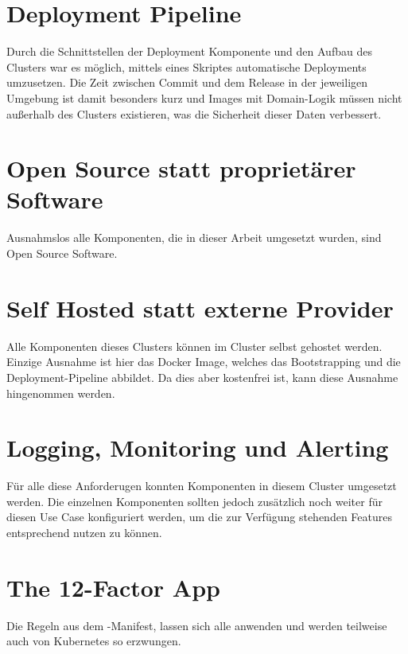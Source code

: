 \section{Deployment Pipeline}

Durch die Schnittstellen der Deployment Komponente
und den Aufbau des Clusters war es möglich, mittels
eines Skriptes automatische Deployments umzusetzen.
Die Zeit zwischen Commit und dem Release in der jeweiligen Umgebung ist
damit besonders kurz und Images mit Domain-Logik müssen nicht außerhalb
des Clusters existieren, was die Sicherheit dieser Daten verbessert.

\section{Open Source statt proprietärer Software}
Ausnahmslos alle Komponenten, die in dieser Arbeit umgesetzt wurden, sind
Open Source Software.

\section{Self Hosted statt externe Provider}
Alle Komponenten dieses Clusters können im Cluster selbst gehostet werden.
Einzige Ausnahme ist hier das Docker Image, welches das Bootstrapping und die
Deployment-Pipeline abbildet. Da dies aber kostenfrei ist, kann diese
Ausnahme hingenommen werden.

\section{Logging, Monitoring und Alerting}

Für alle diese Anforderugen konnten Komponenten
in diesem Cluster umgesetzt werden. Die einzelnen
Komponenten sollten jedoch zusätzlich noch weiter für diesen Use Case
konfiguriert werden, um die zur Verfügung stehenden Features entsprechend
nutzen zu können.

\section{The 12-Factor App}

Die Regeln aus dem -Manifest, lassen sich alle
anwenden und werden teilweise auch von Kubernetes so erzwungen.
